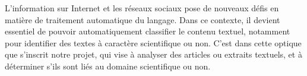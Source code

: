 L'information sur Internet et les réseaux sociaux pose de nouveaux défis en matière de traitement automatique du langage.
Dans ce contexte, il devient essentiel de pouvoir automatiquement classifier le contenu textuel, notamment pour identifier des textes à caractère scientifique ou non.
C’est dans cette optique que s’inscrit notre projet, qui vise à analyser des articles ou extraits textuels, et à déterminer s'ils sont liés au domaine scientifique ou non.
